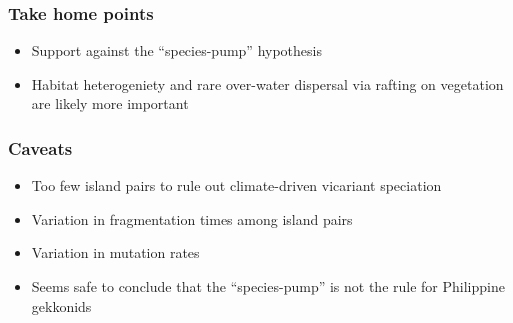 % 

\begin{frame}
    \frametitle{Take home points}
    \begin{itemize}
        \item<1-> Support against the ``species-pump'' hypothesis
        \item<2-> Habitat heterogeniety and rare over-water dispersal via
            rafting on vegetation are likely more important
    \end{itemize}
\end{frame}

\begin{frame}
    \frametitle{Caveats}
    \begin{itemize}
        \item Too few island pairs to rule out climate-driven vicariant
            speciation
        \item Variation in fragmentation times among island pairs
        \item Variation in mutation rates
    \end{itemize}

    \vspace{1cm}
    \begin{itemize}
        \item<2-> Seems safe to conclude that the ``species-pump'' is not the
            rule for Philippine gekkonids
    \end{itemize}
\end{frame}

